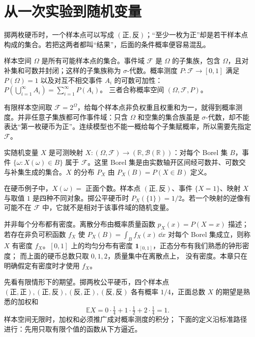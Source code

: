 \section{从一次实验到随机变量}

掷两枚硬币时，一个样本点可以写成 \((\text{正},\text{反})\)；“至少一枚为正”却是若干样本点构成的集合。若把这两者都叫“结果”，后面的条件概率便容易混乱。

\begin{definition}[概率空间]
样本空间 \(\Omega\) 是所有可能样本点的集合。事件域 \(\mathcal F\) 是 \(\Omega\) 的子集族，包含 \(\Omega\)，且对补集和可数并封闭；这样的子集族称为 \(\sigma\)-代数。概率测度 \(P:\mathcal F\to[0,1]\) 满足 \(P(\Omega)=1\) 以及对互不相交事件 \(A_i\) 的可数可加性：
\(P(\bigcup_{i=1}^\infty A_i)=\sum_{i=1}^\infty P(A_i)\)。
三者合称概率空间 \((\Omega,\mathcal F,P)\)。
\end{definition}

有限样本空间取 \(\mathcal F=2^\Omega\)，给每个样本点非负权重且权重和为一，就得到概率测度。并非任意子集族都可作事件域：只含 \(\Omega\) 和空集的集合族虽是 \(\sigma\)-代数，却不能表达“第一枚硬币为正”。连续模型也不能一概给每个子集赋概率，所以需要先指定 \(\mathcal F\)。

\begin{definition}[随机变量及其分布]
实随机变量 \(X\) 是可测映射 \(X:(\Omega,\mathcal F)\to(\mathbb R,\mathcal B(\mathbb R))\)：对每个 Borel 集 \(B\)，事件 \(\{\omega:X(\omega)\in B\}\) 属于 \(\mathcal F\)。这里 Borel 集是由实数轴开区间经可数并、可数交与补集生成的集合。\(X\) 的分布 \(P_X\) 由 \(P_X(B)=P(X\in B)\) 定义。
\end{definition}

在硬币例子中，\(X(\omega)=\) 正面个数。样本点 \((\text{正},\text{反})\)、事件 \(\{X=1\}\)、映射 \(X\) 与取值 \(1\) 是四种不同对象。掷公平硬币时 \(P_X(\{1\})=1/2\)。若一个映射的逆像有可能不在 \(\mathcal F\) 中，它就不是相对于该事件域的随机变量。

并非每个分布都有密度。离散分布由概率质量函数
\(p_X(x)=P(X=x)\) 描述；若存在非负可积函数 \(f_X\) 使
\(P_X(B)=\int_Bf_X(x)\,\dd x\) 对每个 Borel 集成立，则称
\(X\) 有密度 \(f_X\)。\([0,1]\) 上的均匀分布有密度
\(\mathbf1_{[0,1]}\)，正态分布有我们熟悉的钟形密度；
而上面的硬币总数只取 \(0,1,2\)，质量集中在离散点上，
没有密度。本章只在明确假定有密度时才使用 \(f_X\)。

先看有限情形下的期望。掷两枚公平硬币，四个样本点
\((\text{正},\text{正}),(\text{正},\text{反}),
(\text{反},\text{正}),(\text{反},\text{反})\)
各有概率 \(1/4\)，正面总数 \(X\) 的期望是熟悉的加权和
\[
\mathbb EX=0\cdot\tfrac14+1\cdot\tfrac12+2\cdot\tfrac14=1.
\]
样本空间无限时，加权和必须推广成对概率测度的积分；
下面的定义沿标准路径进行：先用只取有限个值的函数从下方逼近。

